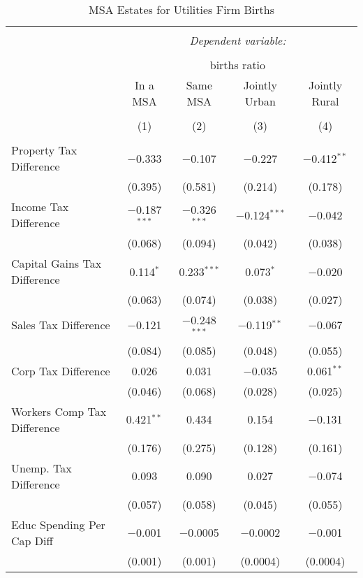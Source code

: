 
\begin{table}[!htbp] \centering 
  \caption{MSA Estates for  Utilities Firm Births} 
  \label{22metro} 
\begin{tabular}{@{\extracolsep{5pt}}lcccc} 
\\[-1.8ex]\hline 
\hline \\[-1.8ex] 
 & \multicolumn{4}{c}{\textit{Dependent variable:}} \\ 
\cline{2-5} 
\\[-1.8ex] & \multicolumn{4}{c}{births ratio} \\ 
 & In a MSA & Same MSA & Jointly Urban & Jointly Rural \\ 
\\[-1.8ex] & (1) & (2) & (3) & (4)\\ 
\hline \\[-1.8ex] 
 Property Tax Difference & $-$0.333 & $-$0.107 & $-$0.227 & $-$0.412$^{**}$ \\ 
  & (0.395) & (0.581) & (0.214) & (0.178) \\ 
  Income Tax Difference & $-$0.187$^{***}$ & $-$0.326$^{***}$ & $-$0.124$^{***}$ & $-$0.042 \\ 
  & (0.068) & (0.094) & (0.042) & (0.038) \\ 
  Capital Gains Tax Difference & 0.114$^{*}$ & 0.233$^{***}$ & 0.073$^{*}$ & $-$0.020 \\ 
  & (0.063) & (0.074) & (0.038) & (0.027) \\ 
  Sales Tax Difference & $-$0.121 & $-$0.248$^{***}$ & $-$0.119$^{**}$ & $-$0.067 \\ 
  & (0.084) & (0.085) & (0.048) & (0.055) \\ 
  Corp Tax Difference & 0.026 & 0.031 & $-$0.035 & 0.061$^{**}$ \\ 
  & (0.046) & (0.068) & (0.028) & (0.025) \\ 
  Workers Comp Tax Difference & 0.421$^{**}$ & 0.434 & 0.154 & $-$0.131 \\ 
  & (0.176) & (0.275) & (0.128) & (0.161) \\ 
  Unemp. Tax Difference & 0.093 & 0.090 & 0.027 & $-$0.074 \\ 
  & (0.057) & (0.058) & (0.045) & (0.055) \\ 
  Educ Spending Per Cap Diff & $-$0.001 & $-$0.0005 & $-$0.0002 & $-$0.001 \\ 
  & (0.001) & (0.001) & (0.0004) & (0.0004) \\ 

\end{tabular}
\end{table}
